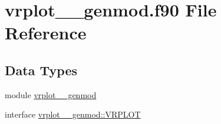 \hypertarget{vrplot____genmod_8f90}{\section{vrplot\+\_\+\+\_\+genmod.\+f90 File Reference}
\label{vrplot____genmod_8f90}
}
\subsection*{Data Types}
\begin{DoxyCompactItemize}
\item 
module \hyperlink{classvrplot____genmod}{vrplot\+\_\+\+\_\+genmod}
\item 
interface \hyperlink{interfacevrplot____genmod_1_1VRPLOT}{vrplot\+\_\+\+\_\+genmod\+::\+V\+R\+P\+L\+O\+T}
\end{DoxyCompactItemize}

